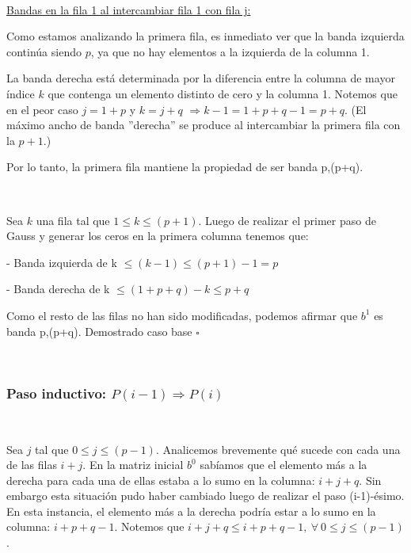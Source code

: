 ~

\underline{Bandas en la fila 1 al intercambiar fila 1 con fila j:}

Como estamos analizando la primera fila, es inmediato ver que la banda izquierda continúa siendo $p$, ya que no hay elementos
a la izquierda de la columna 1.

La banda derecha está determinada por la diferencia entre la columna de mayor índice $k$ que contenga un elemento distinto
de cero y la columna 1. Notemos que en el peor caso $j=1+p$ y $k=j+q$ $\Rightarrow k-1 = 1+p+q-1 = p+q$. (El máximo ancho de 
banda ''derecha'' se produce al intercambiar la primera fila con la $p+1$.)

Por lo tanto, la primera fila mantiene la propiedad de ser banda p,(p+q).

~

Sea $k$ una fila tal que $1 \leq k \leq (p+1)$. Luego de realizar el primer paso de Gauss y generar los ceros en la 
primera columna tenemos que:

- Banda izquierda de k $\leq (k-1) \leq (p+1)-1 = p$

- Banda derecha de k $ \leq (1+p+q)-k \leq p+q $

Como el resto de las filas no han sido modificadas, podemos afirmar que $b^{1}$ es banda p,(p+q). 
Demostrado caso base $\square$

~

\subsubsection{Paso inductivo: $P(i-1) \Rightarrow P(i)$}

~

Sea $j$ tal que $0 \leq j \leq (p-1)$. Analicemos brevemente qué sucede con cada una de las filas $i+j$.
En la matriz inicial $b^{0}$ sabíamos que el elemento más a la derecha para cada una de ellas estaba a lo sumo en la columna:
$i+j+q$. Sin embargo esta situación pudo haber cambiado luego de realizar el paso (i-1)-ésimo. En esta instancia, el
elemento más a la derecha podría estar a lo sumo en la columna: $i+p+q-1$. Notemos que $i+j+q \leq i+p+q-1 , \ \forall 
\ 0 \leq j \leq (p-1)$.

